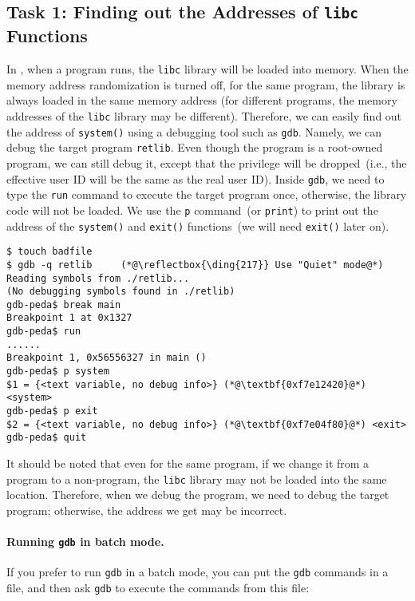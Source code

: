 \subsection{Task 1: Finding out the Addresses of \texttt{libc} Functions} 

In \linux, when a program runs, the \texttt{libc} library will be loaded
into memory. When the memory address randomization is turned off,
for the same program, the library is always loaded in the same memory
address (for different programs, the memory addresses
of the \texttt{libc} library may be different).
Therefore, we can easily find out the address of \texttt{system()}
using a debugging tool such as \texttt{gdb}. Namely, we can debug
the target program \texttt{retlib}. Even though the program is a root-owned \setuid program,
we can still debug it, except that the privilege will be dropped~(i.e., the effective user ID
will be the same as the real user ID).
Inside \texttt{gdb}, we need to type the \texttt{run} command to execute the target program once,
otherwise, the library code will not be loaded.
We use the \texttt{p} command~(or \texttt{print}) to print out the address of
the \texttt{system()} and \texttt{exit()} functions~(we will need \texttt{exit()} later on).

\begin{lstlisting}
$ touch badfile
$ gdb -q retlib     (*@\reflectbox{\ding{217}} Use "Quiet" mode@*)
Reading symbols from ./retlib...
(No debugging symbols found in ./retlib)
gdb-peda$ break main
Breakpoint 1 at 0x1327
gdb-peda$ run
......
Breakpoint 1, 0x56556327 in main ()
gdb-peda$ p system
$1 = {<text variable, no debug info>} (*@\textbf{0xf7e12420}@*) <system>
gdb-peda$ p exit
$2 = {<text variable, no debug info>} (*@\textbf{0xf7e04f80}@*) <exit>
gdb-peda$ quit
\end{lstlisting}

It should be noted that even for the same program, if we change it from a \setuid
program to a non-\setuid program, the \texttt{libc} library may not be loaded
into the same location. Therefore, when we debug the program, we need
to debug the target \setuid program; otherwise, the address we
get may be incorrect.

\paragraph{Running \texttt{gdb} in batch mode.} If you prefer to run \texttt{gdb} 
in a batch mode, you can put the \texttt{gdb} commands in a file, and then 
ask \texttt{gdb} to execute the commands from this file:

